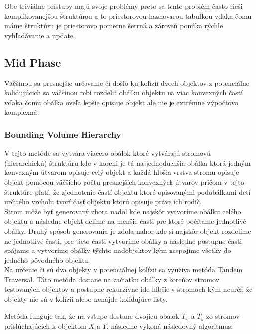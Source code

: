 \documentclass[a4paper]{article}
\begin{document}
	Obe triviálne prístupy majú svoje problémy preto sa tento problém často rieši komplikovanejšou štruktúrou a to priestorovou hashovacou tabuľkou vďaka čomu máme štruktúru je priestorovo pomerne šetrná a zároveň ponúka rýchle vyhľadávanie a update.
	
	\subsection{Mid Phase}  
	
	Väčšinou sa presnejšie určovanie či došlo ku kolízii dvoch objektov z potenciálne kolidujúcich sa väčšinou robí rozdeliť obálku objektu na viac konvexných častí vďaka čomu obálka oveľa lepšie opisuje objekt ale nie je extrémne výpočtovo komplexná.  
	
	\subsubsection{Bounding Volume Hierarchy}	
	
	V tejto metóde sa vytvára viacero obálok ktoré vytvárajú stromovú (hierarchickú) štruktúru kde v koreni je tá najjednoduchšia obálka ktorá jedným konvexným útvarom opisuje celý objekt a každá hlbšia vrstva stromu opisuje objekt pomocou väčšieho počtu presnejších konvexných útvarov pričom v tejto štruktúre platí, že zjednotenie častí objektu ktoré opisovanými podobálkami detí určitého vrcholu tvorí časť objektu ktorú opisuje práve ich rodič.
	\\
	
	Strom môže byť generovaný zhora nadol kde najskôr vytvoríme obálku celého objektu a následne objekt delíme na menšie časti pre ktoré počítame jednotlivé obálky. Druhý spôsob generovania je zdola nahor kde si najskôr objekt rozdelíme ne jednotlivé časti, pre tieto časti vytvoríme obálky a následne postupne časti spájame a vytvoríme obálky týchto nadobjektov kým nespojíme všetky do jedného pôvodného objektu.   
	\\
	
	Na určenie či sú dva objekty v potenciálnej kolízii sa využíva metóda Tandem Traversal. Táto metóda dostane na začiatku obálky z koreňov stromov testovaných objektov a postupne rekurzívne ide hlbšie v stromoch kým neurčí, že objekty nie sú v kolízii alebo nenájde kolidujúce listy. 
	
	Metóda funguje tak, že na vstupe dostane dvojicu obálok $T_x$ a $T_y$ zo stromov prislúchajúcich k objektom $X$ a $Y$, následne vykoná následovný algoritmus:
	\\
	
\end{document}
